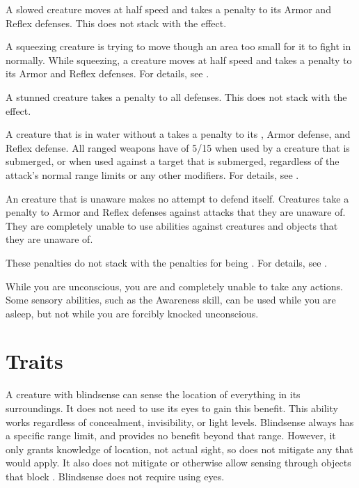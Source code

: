    A slowed creature moves at half speed and takes a  penalty to its Armor and Reflex defenses.
  This does not stack with the \immobilized effect.

   A squeezing creature is trying to move though an area too small for it to fight in normally.
  While squeezing, a creature moves at half speed and takes a  penalty to its Armor and Reflex defenses.
  For details, see .

   A stunned creature takes a  penalty to all defenses.
  This does not stack with the \confused effect.

   A creature that is in water without a  takes a  penalty to its , Armor defense, and Reflex defense.
  All ranged weapons have  of 5/15 when used by a creature that is submerged, or when used against a target that is submerged, regardless of the attack's normal range limits or any other modifiers.
  For details, see .

   An creature that is unaware makes no attempt to defend itself.
  Creatures take a  penalty to Armor and Reflex defenses against attacks that they are unaware of.
  They are completely unable to use  abilities against creatures and objects that they are unaware of.

  These penalties do not stack with the penalties for being \partiallyunaware.
  For details, see .

   While you are unconscious, you are \helpless and completely unable to take any actions.
  Some sensory abilities, such as the Awareness skill, can be used while you are asleep, but not while you are forcibly knocked unconscious.

  \newpage
\section{Traits}\label{Traits}

  A creature with blindsense can sense the location of everything in its surroundings.
  It does not need to use its eyes to gain this benefit.
  This ability works regardless of concealment, invisibility, or light levels.
  Blindsense always has a specific range limit, and provides no benefit beyond that range.
  However, it only grants knowledge of location, not actual sight, so does not mitigate any  that would apply.
  It also does not mitigate  or otherwise allow sensing through objects that block .
  Blindsense does not require using eyes.

